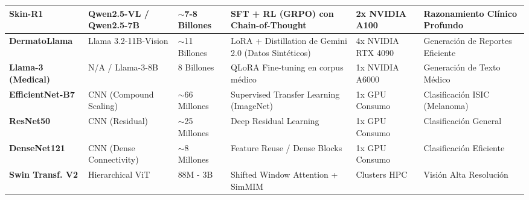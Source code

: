 \documentclass[11pt, a4paper]{article}
\begin{document}
\begin{table}[htbp]
{\begin{tabular}{|l|p{5.5cm}|l|p{6cm}|p{4.5cm}|p{5cm}|}
            \hline
            \textbf{Skin-R1} & Qwen2.5-VL / Qwen2.5-7B & $\sim$7-8 Billones & SFT + RL (GRPO) con Chain-of-Thought & 2x NVIDIA A100 & Razonamiento Clínico Profundo \\
            \hline
            \textbf{DermatoLlama} & Llama 3.2-11B-Vision & $\sim$11 Billones & LoRA + Distillation de Gemini 2.0 (Datos Sintéticos) & 4x NVIDIA RTX 4090 & Generación de Reportes Eficiente \\
            \hline
            \textbf{Llama-3 (Medical)} & N/A / Llama-3-8B & 8 Billones & QLoRA Fine-tuning en corpus médico & 1x NVIDIA A6000 & Generación de Texto Médico \\
            \hline
            \textbf{EfficientNet-B7} & CNN (Compound Scaling) & $\sim$66 Millones & Supervised Transfer Learning (ImageNet) & 1x GPU Consumo & Clasificación ISIC (Melanoma) \\
            \hline
            \textbf{ResNet50} & CNN (Residual) & $\sim$25 Millones & Deep Residual Learning & 1x GPU Consumo & Clasificación General \\
            \hline
            \textbf{DenseNet121} & CNN (Dense Connectivity) & $\sim$8 Millones & Feature Reuse / Dense Blocks & 1x GPU Consumo & Clasificación Eficiente \\
            \hline
            \textbf{Swin Transf. V2} & Hierarchical ViT & 88M - 3B & Shifted Window Attention + SimMIM & Clusters HPC & Visión Alta Resolución \\
            \hline
        \end{tabular}%
    }
    \endgroup
    \footnotesize{
    \vspace{0.2cm}
    }
\end{table}
\end{document}
